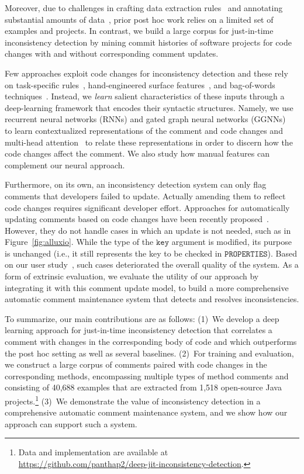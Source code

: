 \documentclass[letterpaper]{article} %
\newcommand{\CodeIn}[1]{{\ifmmode{\mathtt{#1}}\else$\mathtt{#1}$\fi}}
\newcommand{\Posthoc}{post hoc}
\newcommand{\JustInTime}{just-in-time}
\newcommand{\NumOfProjects}{1,518}
\newcommand{\NumOfExamples}{40,688}
\begin{document}
Moreover, due to challenges in crafting  data extraction rules~\cite{icomment2007,aComment} and annotating substantial amounts of data~\cite{Corazza18}, prior \Posthoc{} work relies on a limited set of examples and projects. In contrast, we build a large corpus for \JustInTime{} inconsistency detection by mining commit histories of software projects for  code changes with and without corresponding comment updates.


Few approaches exploit code changes for inconsistency detection and these rely on task-specific rules~\cite{SaduThesis}, hand-engineered surface features~\cite{LiuOutdatedLine,Malik08}, and bag-of-words techniques~\cite{LiuOutdatedLine}.
Instead, we  \textit{learn} salient characteristics of these inputs through a deep-learning framework that encodes their syntactic structures. Namely, we use recurrent neural networks (RNNs) and gated graph neural networks (GGNNs)~\cite{Li2016GatedGS} to learn contextualized representations of the comment and code changes and multi-head attention~\cite{transformer}
to relate these representations in order to discern how the code changes affect the comment. We also study how manual features can complement our neural approach.

Furthermore, on its own,
an inconsistency detection system can only flag comments that developers failed to update. Actually amending them to reflect code changes requires significant developer effort. Approaches for automatically updating comments based on code changes have been recently proposed~\cite{panthaplackel2020update, LiuJITUpdate}. However, they do not handle cases in which an update is not needed, such as in
Figure~\ref{fig:alluxio}. While the type of the \CodeIn{key} argument is modified, its purpose is unchanged (i.e., it still represents the key to be checked in \CodeIn{PROPERTIES}). Based on our user study~\cite{panthaplackel2020update}, such cases deteriorated the overall quality of the system.
As a form of extrinsic evaluation, we evaluate the utility of our approach by integrating
it with this comment update model, to build a more comprehensive automatic comment maintenance system that detects and resolves inconsistencies.

To summarize, our main contributions are as follows: (1)~We develop a deep learning approach for \JustInTime{} inconsistency detection that correlates a comment with changes in the corresponding body of code and which outperforms the \Posthoc{} setting as well as several baselines. (2)~For training and evaluation, we construct a large corpus of comments paired with code changes in the corresponding methods, encompassing multiple types of method comments and consisting of \NumOfExamples{} examples that are extracted from \NumOfProjects{} open-source Java projects.\footnote{Data and implementation are available at \url{https://github.com/panthap2/deep-jit-inconsistency-detection}.} (3)~We demonstrate the value of inconsistency detection in a comprehensive automatic comment maintenance system, and we show how our approach can support such a system.
\end{document}
